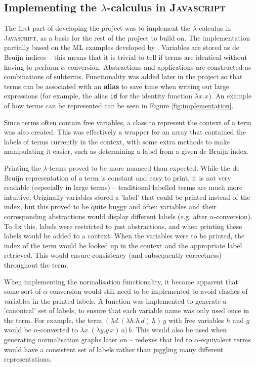 \documentclass[11pt]{article}
\begin{document}
\subsection{Implementing the \texorpdfstring{$\lambda$}{lambda}-calculus in \textsc{Javascript}}
\label{sec:implementation-lambda}
The first part of developing the project was to implement the $\lambda$-calculus in \textsc{Javascript}, as a basis for the rest of the project to build on. The implementation partially based on the \textsc{ML} examples developed by \cite{pierce}. Variables are stored as de Bruijn indices -- this means that it is trivial to tell if terms are identical without having to perform $\alpha$-conversion. Abstractions and applications are constructed as combinations of subterms. Functionality was added later in the project so that terms can be associated with an \textbf{alias} to save time when writing out large expressions (for example, the alias \texttt{id} for the identity function $\lambda x. x$). An example of how terms can be represented can be seen in Figure \ref{fig:implementation}.

Since terms often contain free variables, a class to represent the context of a term was also created. This was effectively a wrapper for an array that contained the labels of terms currently in the context, with some extra methods to make manipulating it easier, such as determining a label from a given de Bruijn index. 

Printing the $\lambda$-terms proved to be more nuanced than expected. While the de Bruijn representation of a term is constant and easy to print, it is not very readable (especially in large terms) -- traditional labelled terms are much more intuitive. Originally variables stored a 'label' that could be printed instead of the index, but this proved to be quite buggy and often variables and their corresponding abstractions would display different labels (e.g. after $\alpha$-conversion). To fix this, labels were restricted to just abstractions, and when printing these labels would be added to a context. When the variables were to be printed, the index of the term would be looked up in the context and the appropriate label retrieved. This would ensure consistency (and subsequently correctness) throughout the term. 

When implementing the normalisation functionality, it became apparent that some sort of $\alpha$-conversion would still need to be implemented to avoid clashes of variables in the printed labels. A function was implemented to generate a 'canonical' set of labels, to ensure that each variable name was only used once in the term. For example, the term $(\lambda d. (\lambda h. h \, d) \, h) \, g$ with free variables $h$ and $g$ would be $\alpha$-converted to $\lambda x. (\lambda y. y \, x) \, a) \, b$. This would also be used when generating normalisation graphs later on -- redexes that led to $\alpha$-equivalent terms would have a consistent set of labels rather than juggling many different representations.
\end{document}
